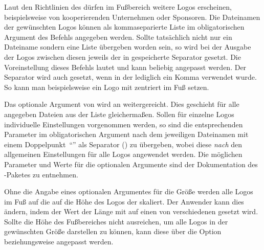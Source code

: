 \begin{Declaration}[v2.03]{%
  \LParameter{}%
}
\begin{Declaration}[v2.03]{}%
\begin{Declaration}[v2.03]{}%
\printdeclarationlist%
%
%

Laut den Richtlinien des \CDs dürfen im Fußbereich weitere Logos erscheinen, 
beispielsweise von kooperierenden Unternehmen oder Sponsoren. Die Dateinamen 
der gewünschten Logos können als kommaseparierte Liste im obligatorischen 
Argument des Befehls  angegeben werden. Sollte tatsächlich 
nicht nur ein Dateiname sondern eine Liste übergeben worden sein, so wird bei 
der Ausgabe der Logos zwischen diesen jeweils der in  
gespeicherte Separator gesetzt. Die Voreinstellung dieses Befehls lautet
 und kann 
beliebig angepasst werden. Der Separator wird auch gesetzt, wenn in der 
 lediglich ein Komma verwendet wurde. So kann man 
beispielsweise ein Logo mit  
zentriert im Fuß setzen.

Das optionale Argument von  wird an  
weitergereicht. Dies geschieht für alle angegeben Dateien aus der Liste 
gleichermaßen. Sollen für einzelne Logos individuelle Einstellungen vorgenommen 
werden, so sind die entsprechenden Parameter im obligatorischen Argument nach 
dem jeweiligen Dateinamen mit einem Doppelpunkt~\enquote{\PValue{:}} als 
Separator () zu 
übergeben, wobei diese \emph{nach} den allgemeinen Einstellungen für alle Logos 
angewendet werden. Die möglichen Parameter und Werte für die optionalen 
Argumente sind der Dokumentation des -Paketes zu entnehmen.

Ohne die Angabe eines optionalen Argumentes für die Größe werden alle Logos im 
Fuß auf die auf die Höhe des Logos der \TnUD skaliert. Der Anwender kann dies 
ändern, indem der Wert der Länge  mit  
auf einen von \PValue{0pt} verschiedenen gesetzt wird. Sollte die Höhe des 
Fußbereiches nicht ausreichen, um alle Logos in der gewünschten Größe 
darstellen zu können, kann diese über die Option  
beziehungsweise  angepasst werden.
\end{Declaration}
\end{Declaration}
\end{Declaration}

